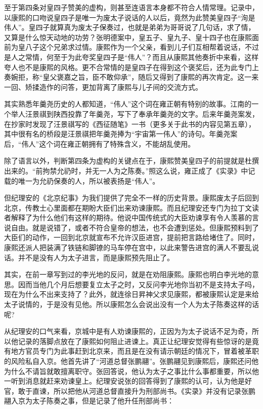 
至于第四条对皇四子赞美的虚构，则甚至连语言本身都不符合人情常理。记录中，以康熙的口吻说皇四子是唯一为废太子说话的人以后，竟然为此赞美皇四子“洵是伟人”。皇四子就算真为废太子保奏过，也就是弟弟为哥哥说了几句话，求了情，又算是什么惊天动地的功劳？张明德案中，皇五子、皇九子、皇十四子也在康熙面前为皇八子这个兄弟求过情。康熙作为一个父亲，看到儿子们互相帮着说话，不过是人之常情，何至于为此夸奖皇四子是“伟人”？而且从康熙其他奏折中来看，这样夸人也不是康熙的风格。更不合常情的是皇四子在得到这个褒奖后，还为此专门上奏婉拒，称“皇父褒嘉之旨，臣不敢仰承”，随后又得到了康熙的再次肯定。这一来一回、矫揉造作的问答，更加背离了康熙与儿子间的交流方式。



其实熟悉年羹尧历史的人都知道，“伟人”这个词在雍正朝有特别的故事。江南的一个举人汪景祺到陕西投靠了年羹尧，写下了奉承年羹尧的文字。后来年羹尧案发，在抄家时发现了汪景祺写的《西征随笔》一书（更多关于此书的内容见第五章），其中很有名的桥段是汪景祺把年羹尧捧为“宇宙第一伟人”的诗句。年羹尧案后，“伟人”这个词在雍正朝拥有了特殊含义，不能胡乱使用。



除了语言以外，判断第四条为虚构的关键点在于，康熙赞美皇四子的前提就是杜撰出来的。“前拘禁允礽时，并无一人为之陈奏。”照这么说，雍正成了《实录》中记载的唯一为允礽保奏的人，所以被表扬是“伟人”。



但纪理安的《北京纪事》为我们提供了完全不一样的历史背景。康熙废太子后回到北京，传教士心里面都在期盼大臣们出来劝谏康熙。而且纪理安还专门为拉丁文读者解释了为什么他们有这样的期待。他说中国传统式的大臣劝谏享有令人羡慕的言说自由。就是说错了，或者不符合皇帝的想法，也不会遭到惩处。但康熙预料到了大臣们的动作，一回到北京就宣布不允许汉臣进宫，提前把言路给堵住了。同时，康熙还派人把装满了铁链和脚镣的马车停在宫中，以此来警告进宫的满人不要乱说话。并不是没有人为太子进言，而是康熙预先阻止了。



其实，在前一章写到过的李光地的反问，就是在劝阻康熙。康熙也明白李光地的意思。因而当他几个月后想要复立太子之时，又反问李光地你当初不是支持太子吗，现在为什么不出来支持了？此外，就连徐日昇神父求见康熙，都被康熙认定是来给太子说情的，于是没有见他。所以康熙怎么会说出没有一个人为太子陈奏这样的话呢?



从纪理安的口气来看，京城中是有人劝谏康熙的，正因为为太子说话不足为奇，所以他记录的落脚点放在了康熙如何阻止进谏上。真正让纪理安觉得有些惊讶的是竟有地方官员专门为此事赶到北京来，而且是在没有请示朝廷的情况下，冒着被革职的风险私自入京。他首先讲了“河道总督张鹏翮”。张鹏翮见到康熙后，康熙还问他为什么不请旨就敢擅离职守。张回答说，他认为太子之事比什么事都重要，所以他一听到消息就赶来劝谏皇上。纪理安说张的回答得到了康熙的认可，认为他是好官，敢于直谏，所以把他从河道总督直接升为刑部尚书。《实录》并没有记录张鹏翮入京为太子陈奏之事，但是记录了他升任刑部尚书：


